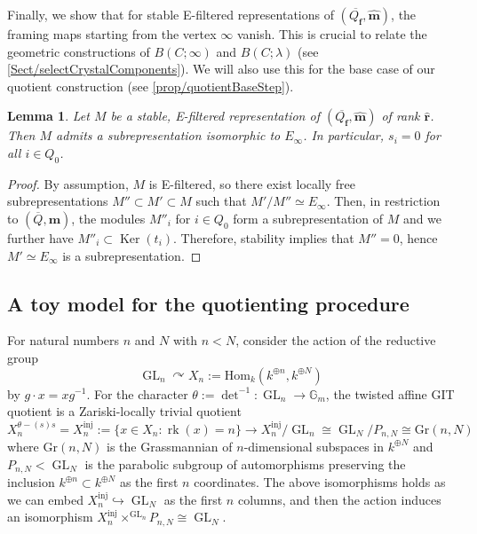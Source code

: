 \documentclass[a4paper,12pt]{article}
\theoremstyle{definition}
\theoremstyle{plain}
\newtheorem{lemma}[definition]{Lemma}
\theoremstyle{remark}
\DeclareMathOperator{\Ker}{Ker}
\DeclareMathOperator{\GL}{GL}
\DeclareMathOperator{\rk}{rk}
\newcommand\GG{\mathbb{G}}
\newcommand\bff{\mathbf{f}}
\newcommand\bfm{\mathbf{m}}
\newcommand\bfr{\mathbf{r}}
\begin{document}
Finally, we show that for stable E-filtered representations of $(\overline{Q_\bff},\widehat{\bfm})$, the framing maps starting from the vertex $\infty$ vanish. This is crucial to relate the geometric constructions of $B(C;\infty)$ and $B(C;\lambda)$ (see \cref{Sect/selectCrystalComponents}). We will also use this for the base case of our quotient construction (see \cref{prop/quotientBaseStep}).

\begin{lemma}\label{Lem/framingVanishing}
Let $M$ be a stable, E-filtered representation of $(\overline{Q_\bff},\widehat{\bfm})$ of rank $\widehat{\bfr}$. Then $M$ admits a subrepresentation isomorphic to $E_\infty$. In particular, $s_i=0$ for all $i\in Q_0$.
\end{lemma}

\begin{proof}
By assumption, $M$ is E-filtered, so there exist locally free subrepresentations $M''\subset M'\subset M$ such that $M'/M''\simeq E_\infty$. Then, in restriction to $(\overline{Q},\bfm)$, the modules $M''_i$ for $i\in Q_0$ form a subrepresentation of $M$ and we further have $M''_i\subset\Ker(t_i)$. Therefore, stability implies that $M''=0$, hence $M'\simeq E_\infty$ is a subrepresentation.
\end{proof}

\subsection{A toy model for the quotienting procedure}\label{Sect/toyModel}


For natural numbers $n$ and $N$ with $n <N$,  consider the action of the reductive group
\[ \GL_n \curvearrowright X_n:=\mathrm{Hom}_k(k^{\oplus n},k^{\oplus N})\]
by $g \cdot x = x g^{-1}$. For the character $\theta := \det^{-1} \colon \GL_n \rightarrow \GG_m$, the twisted affine GIT quotient is a Zariski-locally trivial quotient
\[ X_n^{\theta-(s)s}  = X_n^{\mathrm{inj}}:=\{ x \in X_n : \rk(x) = n \} \rightarrow  X_n^{\mathrm{inj}}/\GL_n \cong \GL_N /P_{n,N}\cong \mathrm{Gr}({n,N}) \]
where $\mathrm{Gr}({n,N})$ is the Grassmannian of $n$-dimensional subspaces in $k^{\oplus N}$ and $P_{n,N} < \GL_N$ is the parabolic subgroup of automorphisms preserving the inclusion $k^{\oplus n} \subset k^{\oplus N}$ as the first $n$ coordinates. The above isomorphisms holds as we can embed $X_n^{\mathrm{inj}} \hookrightarrow \GL_N$ as the first $n$ columns, and then the action induces an isomorphism $X_n^{\mathrm{inj}} \times^{\GL_n} P_{n,N} \cong \GL_N$. 
\end{document}
